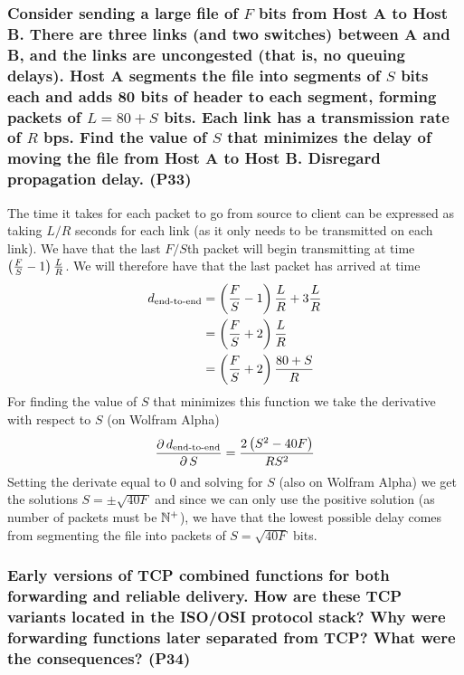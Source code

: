 \subsubsection{Consider sending a large file of $F$ bits from Host A to Host B. There are three links (and two switches) between A and B, and the links are uncongested (that is, no queuing delays). Host A segments the file into segments of $S$ bits each and adds 80 bits of header to each segment, forming packets of $L = 80 + S$ bits. Each link has a transmission rate of $R$ bps. Find the value of $S$ that minimizes the delay of moving the file from Host A to Host B. Disregard propagation delay. (P33)}
The time it takes for each packet to go from source to client can be expressed as taking $L/R$ seconds for each link (as it only needs to be transmitted on each link). We have that the last $F/S$th packet will begin transmitting at time $ \left (\frac{F}{S} - 1\right) \frac{L}{R}$. We will therefore have that the last packet has arrived at time
\begin{equation*}
\begin{split}
    d_\text{end-to-end} &= \left (\frac{F}{S} - 1\right) \frac{L}{R} + 3 \frac{L}{R} \\
    &= \left (\frac{F}{S} + 2\right) \frac{L}{R} \\
    &= \left (\frac{F}{S} + 2\right) \frac{80 + S}{R}
\end{split}
\end{equation*}
For finding the value of $S$ that minimizes this function we take the derivative with respect to $S$ (on Wolfram Alpha)
\begin{equation*}
    \frac{\partial \, d_\text{end-to-end}}{\partial \, S} = \frac{2 \left (S^2 - 40F\right)}{R S^2}
\end{equation*}
Setting the derivate equal to 0 and solving for $S$ (also on Wolfram Alpha) we get the solutions $S = \pm \sqrt{40 F}$ and since we can only use the positive solution (as number of packets must be $\mathbb N^+$), we have that the lowest possible delay comes from segmenting the file into packets of $S = \sqrt{40 F}$ bits.

\subsubsection{Early versions of TCP combined functions for both forwarding and reliable delivery. How are these TCP variants located in the ISO/OSI protocol stack? Why were forwarding functions later separated from TCP? What were the consequences? (P34)}

